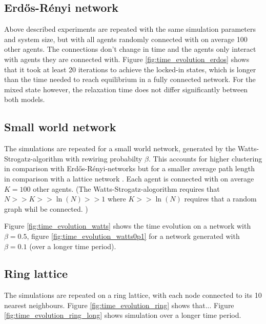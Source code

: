 \documentclass[]{article}
\begin{document}
\subsection{Erd\H{o}s-Rényi network}

Above described experiments are repeated with the same simulation parameters and system size, but with all agents randomly connected with on average 100 other agents. The connections don't change in time and the agents only interact with agents they are connected with. Figure \ref{fig:time_evolution_erdos} shows that it took at least 20 iterations to achieve the locked-in states, which is longer than the time needed to reach equilibrium in a fully connected network. For the mixed state however, the relaxation time does not differ significantly between both models.

\subsection{Small world network}

The simulations are repeated for a small world network, generated by the Watts-Strogatz-algorithm with rewiring probabilty $\beta$. This accounts for higher clustering in comparison with  Erd\H{o}s-Rényi-networks but for a smaller average path length in comparison with a lattice network  \cite{watts98}. Each agent is connected with on average $K=100$ other agents. (The Watts-Strogatz-alogorithm requires that $N >> K >> \ln(N) >> 1$ where $ K >> \ln(N)$ requires that a random graph whil be connected. ) 

 Figure \ref{fig:time_evolution_watts} shows the time evolution on a network with $\beta=0.5$, figure \ref{fig:time_evolution_watts0p1} for a network generated with $\beta=0.1$ (over a longer time period). 
 
 
 

\subsection{Ring lattice}

The simulations are repeated on a ring lattice, with each node connected to its 10 nearest neighbours. Figure \ref{fig:time_evolution_ring} shows that... %
Figure \ref{fig:time_evolution_ring_long} shows simulation over a longer time period.
\end{document}
